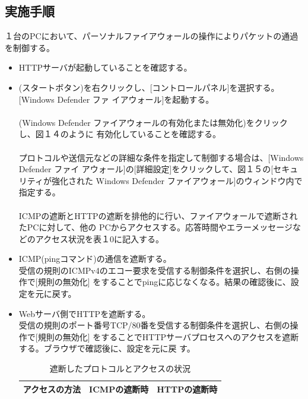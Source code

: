 \documentclass[10pt]{article}
\begin{document}
\subsection{実施手順}
１台のPCにおいて、パーソナルファイアウォールの操作によりパケットの通過を制御する。 
\begin{itemize}
    \item HTTPサーバが起動していることを確認する。
    \item (スタートボタン)を右クリックし、[コントロールパネル]を選択する。[Windows Defender ファ
    イアウォール]を起動する。\\\\ 
        (Windows Defender ファイアウォールの有効化または無効化)をクリックし、図１４のように
        有効化していることを確認する。\\\\
        プロトコルや送信元などの詳細な条件を指定して制御する場合は、[Windows Defender ファイ
        アウォール]の[詳細設定]をクリックして、図１５の[セキュリティが強化された Windows
        Defender ファイアウォール]のウィンドウ内で指定する。\\\\
        ICMPの遮断とHTTPの遮断を排他的に行い、ファイアウォールで遮断されたPCに対して、他の
        PCからアクセスする。応答時間やエラーメッセージなどのアクセス状況を表１0に記入する。 \\
    \item ICMP(pingコマンド)の通信を遮断する。 \\
        受信の規則のICMPv4のエコー要求を受信する制御条件を選択し、右側の操作で[規則の無効化]
        をすることでpingに応じなくなる。結果の確認後に、設定を元に戻す。 
    \item Webサーバ側でHTTPを遮断する。\\
        受信の規則のポート番号TCP/80番を受信する制御条件を選択し、右側の操作で[規則の無効化]
        をすることでHTTPサーバプロセスへのアクセスを遮断する。ブラウザで確認後に、設定を元に戻
        す。 
            \begingroup
            \setlength{\tabcolsep}{5pt} %
            \renewcommand{\arraystretch}{1.5} %
                \begin{table}[H]
                \centering
            	\caption{遮断したプロトコルとアクセスの状況}
            	\begin{tabular}{|l|l|l|}
            	    \hline
            	    アクセスの方法 &ICMPの遮断時 & HTTPの遮断時 \\[0.5ex]
            		\hline\hline

\end{tabular}
\end{table}
\end{itemize}
\end{document}

